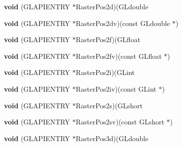 \begin{DoxyCompactItemize}
\item 
\mbox{\label{struct_____g_ldispatch_table_rec_abd920e3762d83720d0e71d61be332dd5}} 
{\bfseries void} (G\+L\+A\+P\+I\+E\+N\+T\+RY $\ast$Raster\+Pos2d)(G\+Ldouble
\item 
\mbox{\label{struct_____g_ldispatch_table_rec_a738c0c6a51c25e647d92752851904a3e}} 
{\bfseries void} (G\+L\+A\+P\+I\+E\+N\+T\+RY $\ast$Raster\+Pos2dv)(const G\+Ldouble $\ast$)
\item 
\mbox{\label{struct_____g_ldispatch_table_rec_acea4785f4baead98dc8ae3b6ffdb9ba9}} 
{\bfseries void} (G\+L\+A\+P\+I\+E\+N\+T\+RY $\ast$Raster\+Pos2f)(G\+Lfloat
\item 
\mbox{\label{struct_____g_ldispatch_table_rec_a397e207054967e5f3fcfe81aad16fe1a}} 
{\bfseries void} (G\+L\+A\+P\+I\+E\+N\+T\+RY $\ast$Raster\+Pos2fv)(const G\+Lfloat $\ast$)
\item 
\mbox{\label{struct_____g_ldispatch_table_rec_a4954ceddfe02b4adcec9c22b3fa9bc2a}} 
{\bfseries void} (G\+L\+A\+P\+I\+E\+N\+T\+RY $\ast$Raster\+Pos2i)(G\+Lint
\item 
\mbox{\label{struct_____g_ldispatch_table_rec_ab42579992113536a6d7a9716a77237c8}} 
{\bfseries void} (G\+L\+A\+P\+I\+E\+N\+T\+RY $\ast$Raster\+Pos2iv)(const G\+Lint $\ast$)
\item 
\mbox{\label{struct_____g_ldispatch_table_rec_ab2658f07bbc533bd18c52f833992107a}} 
{\bfseries void} (G\+L\+A\+P\+I\+E\+N\+T\+RY $\ast$Raster\+Pos2s)(G\+Lshort
\item 
\mbox{\label{struct_____g_ldispatch_table_rec_ab434a2809d64b45424e70bf54a146e38}} 
{\bfseries void} (G\+L\+A\+P\+I\+E\+N\+T\+RY $\ast$Raster\+Pos2sv)(const G\+Lshort $\ast$)
\item 
\mbox{\label{struct_____g_ldispatch_table_rec_a4105a813460897f90a93e254d0f64acb}} 
{\bfseries void} (G\+L\+A\+P\+I\+E\+N\+T\+RY $\ast$Raster\+Pos3d)(G\+Ldouble

\end{DoxyCompactItemize}
